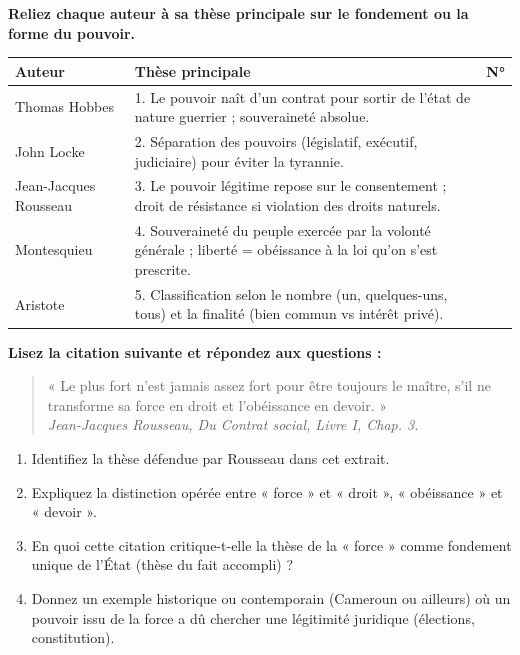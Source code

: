 \documentclass[11pt]{article}
\newcommand{\cle}[1]{{\popxbold\color{popdark}#1}}
\newcounter{popsec}
\newcounter{popsub}
\newcommand{\courssub}[1]{%
  \stepcounter{popsub}%
  \par\vspace{9pt}\noindent{\popxbold\fontsize{11.5}{13}\selectfont\color{popink}{\color{poporange}\thepopsec.\thepopsub}\hspace{6pt}#1}\par\nopagebreak\vspace{4pt}
}
\begin{document}
\begin{exercice}
\textbf{Reliez chaque auteur à sa thèse principale sur le fondement ou la forme du pouvoir.}
\begin{center}
\begin{tabularx}{\linewidth}{|l|X|l|}\hline
\textbf{Auteur} & \textbf{Thèse principale} & \textbf{N°} \\ \hline
Thomas Hobbes & 1. Le pouvoir naît d'un contrat pour sortir de l'état de nature guerrier ; souveraineté absolue. & \\ \hline
John Locke & 2. Séparation des pouvoirs (législatif, exécutif, judiciaire) pour éviter la tyrannie. & \\ \hline
Jean-Jacques Rousseau & 3. Le pouvoir légitime repose sur le consentement ; droit de résistance si violation des droits naturels. & \\ \hline
Montesquieu & 4. Souveraineté du peuple exercée par la volonté générale ; liberté = obéissance à la loi qu'on s'est prescrite. & \\ \hline
Aristote & 5. Classification selon le nombre (un, quelques-uns, tous) et la finalité (bien commun vs intérêt privé). & \\ \hline
\end{tabularx}
\end{center}
\end{exercice}

\courssub{Je m'entraîne}

\begin{exercice}
\textbf{Lisez la citation suivante et répondez aux questions :}
\begin{quote}
« Le plus fort n'est jamais assez fort pour être toujours le maître, s'il ne transforme sa force en droit et l'obéissance en devoir. » \\
\emph{Jean-Jacques Rousseau, \textit{Du Contrat social}, Livre I, Chap. 3.}
\end{quote}
\begin{enumerate}
    \item Identifiez la thèse défendue par Rousseau dans cet extrait.
    \item Expliquez la distinction opérée entre « force » et « droit », « obéissance » et « devoir ».
    \item En quoi cette citation critique-t-elle la thèse de la « force » comme fondement unique de l'État (thèse du fait accompli) ?
    \item Donnez un exemple historique ou contemporain (Cameroun ou ailleurs) où un pouvoir issu de la force a dû chercher une \cle{légitimité} juridique (élections, constitution).
\end{enumerate}
\end{exercice}
\end{document}
